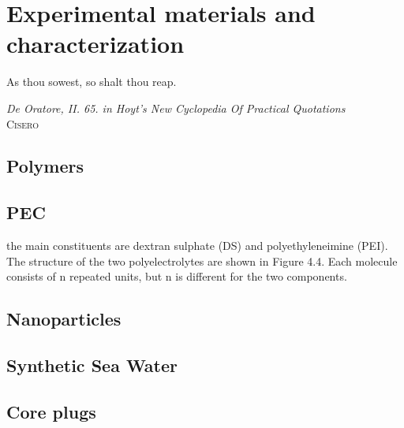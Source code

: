 \chapter{Experimental materials and characterization}
\label{chap:materials}
\vspace*{\fill}
\epigraph{As thou sowest, so shalt thou reap.}%
{\textit{De Oratore, II. 65. in Hoyt's New Cyclopedia Of Practical Quotations}\\ \textsc{Cisero}}
\clearpage{\thispagestyle{empty}\cleardoublepage}
\section{Polymers}

\section{PEC}
the main constituents are dextran sulphate (DS) and polyethyleneimine (PEI). The structure of the two polyelectrolytes are shown in Figure 4.4. Each molecule consists of n repeated units, but n is different for the two components.

\section{Nanoparticles}


\section{Synthetic Sea Water}


\section{Core plugs}